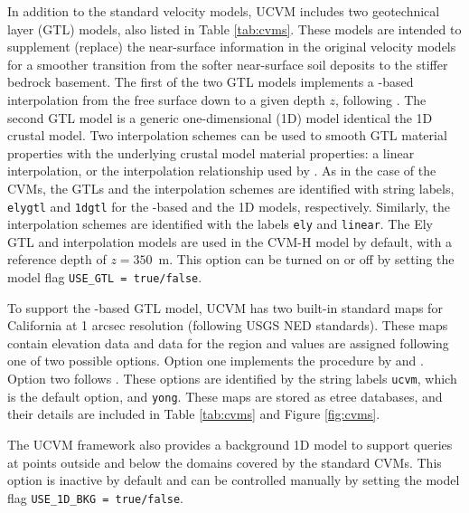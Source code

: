 In addition to the standard velocity models, UCVM includes two geotechnical layer (GTL) models, also listed in Table \ref{tab:cvms}. These models are intended to supplement (replace) the near-surface information in the original velocity models for a smoother transition from the softer near-surface soil deposits to the stiffer bedrock basement. The first of the two GTL models implements a \vsthirty-based interpolation from the free surface down to a given depth $z$, following \citet{Ely_2010_AGU}. The second GTL model is a generic one-dimensional (1D) model identical the 1D crustal model. Two interpolation schemes can be used to smooth GTL material properties with the underlying crustal model material properties: a linear interpolation, or the interpolation relationship used by \citet{Ely_2010_AGU}. As in the case of the CVMs, the GTLs and the interpolation schemes are identified with string labels, \texttt{elygtl} and \texttt{1dgtl} for the \vsthirty-based and the 1D models, respectively. Similarly, the interpolation schemes are identified with the labels \texttt{ely} and \texttt{linear}. The Ely GTL and interpolation models are used in the CVM-H model by default, with a reference depth of $z=350$~m. This option can be turned on or off by setting the model flag \texttt{USE\_GTL = true/false}.

To support the \vsthirty-based GTL model, UCVM has two built-in standard maps for California at 1 arcsec resolution (following USGS NED standards). These maps contain elevation data and \vsthirty{} data for the region and \vsthirty{} values are assigned following one of two possible options. Option one implements the procedure by \citet{Wills_2006_BSSA} and \citet{Wald_2007_BSSA}. Option two follows \citet{Yong_2012_BSSA}. These options are identified by the string labels \texttt{ucvm}, which is the default option, and \texttt{yong}. These maps are stored as etree databases, and their details are included in Table \ref{tab:cvms} and Figure \ref{fig:cvms}.

The UCVM framework also provides a background 1D model to support queries at points outside and below the domains covered by the standard CVMs. This option is inactive by default and can be controlled manually by setting the model flag \texttt{USE\_1D\_BKG = true/false}.





%

